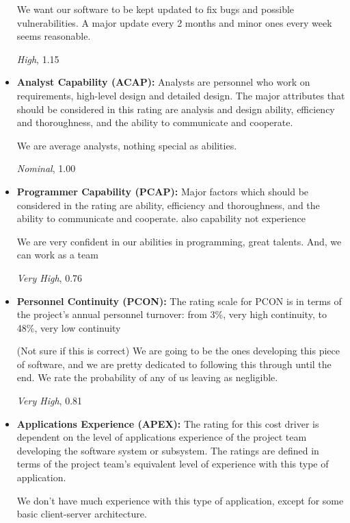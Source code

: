 \documentclass[english]{article}
\begin{document}
\begin{itemize}
We want our software to be kept updated to fix bugs and possible vulnerabilities. A major update every 2 months and minor ones every week seems reasonable.

\textit{High}, 1.15


\item \textbf{Analyst Capability (ACAP):} Analysts are personnel who work on requirements, high-level design and detailed design. The major attributes that should be considered in this rating are analysis and design ability, efficiency and thoroughness, and the ability to communicate and cooperate.

We are average analysts, nothing special as abilities.

\textit{Nominal}, 1.00

\item \textbf{Programmer Capability (PCAP):} Major factors which should be considered in the rating are ability, efficiency and thoroughness, and the ability to communicate and cooperate. also capability not experience

We are very confident in our abilities in programming, great talents. And, we can work as a team

\textit{Very High}, 0.76


\item \textbf{Personnel Continuity (PCON):} The rating scale for PCON is in terms of the project’s annual personnel turnover: from
3\%, very high continuity, to 48\%, very low continuity

(Not sure if this is correct) We are going to be the ones developing this piece of software, and we are pretty dedicated to following this through until the end. We rate the probability of any of us leaving as negligible.

\textit{Very High}, 0.81


\item \textbf{Applications Experience (APEX):} The rating for this cost driver is dependent on the level of applications experience of the project team developing the software system or subsystem. The ratings are defined in terms of the project team’s equivalent level of experience with this type of application.

We don't have much experience with this type of application, except for some basic client-server architecture.


\end{itemize}
\end{document}
